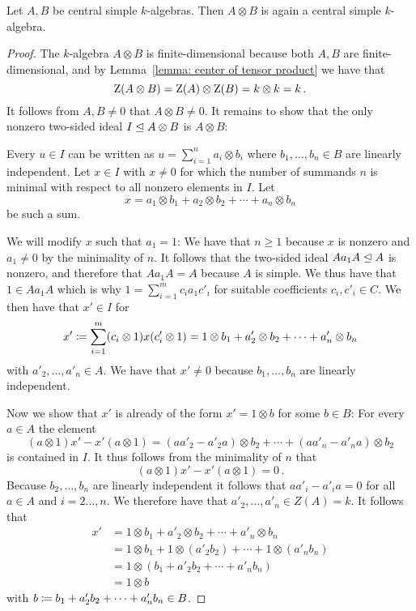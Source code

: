 \begin{corollary}
  Let $A, B$ be central simple $k$-algebras.
  Then $A \otimes B$ is again a central simple $k$-algebra.
\end{corollary}


\begin{proof}
  The $k$-algebra $A \otimes B$ is finite-dimensional because both $A, B$ are finite-di\-men\-si\-o\-nal, and by Lemma~\ref{lemma: center of tensor product} we have that
  \[
      \operatorname{Z}(A \otimes B)
    = \operatorname{Z}(A) \otimes \operatorname{Z}(B)
    = k \otimes k
    = k \,.
  \]
  It follows from $A, B \neq 0$ that $A \otimes B \neq 0$.
  It remains to show that the only nonzero two-sided ideal $I \trianglelefteq A \otimes B$ is $A \otimes B$:
  
  Every $u \in I$ can be written as $u = \sum_{i=1}^n a_i \otimes b_i$ where $b_1, \dotsc, b_n \in B$ are linearly independent.
  Let $x \in I$ with $x \neq 0$ for which the number of summands $n$ is minimal with respect to all nonzero elements in $I$.
  Let
  \begin{equation}
    \label{eqn: u as a sum}
      x
    = a_1 \otimes b_1 + a_2 \otimes b_2 + \dotsb + a_n \otimes b_n
  \end{equation}
  be such a sum.
  
  We will modify $x$ such that $a_1 = 1$:
  We have that $n \geq 1$ because $x$ is nonzero and $a_1 \neq 0$ by the minimality of $n$.
  It follows that the two-sided ideal $A a_1 A \trianglelefteq A$ is nonzero, and therefore that $A a_1 A = A$ because $A$ is simple.
  We thus have that $1 \in A a_1 A$ which is why $1 = \sum_{i=1}^m c_i a_1 c'_i$ for suitable coefficients $c_i, c'_i \in C$.
  We then have that $x' \in I$ for
  \[
              x'
    \coloneqq  \sum_{i=1}^m (c_i \otimes 1) x (c'_i \otimes 1)
    =         1 \otimes b_1 + a'_2 \otimes b_2 + \dotsb + a'_n \otimes b_n
  \]
  with $a'_2, \dotsc, a'_n \in A$.
  We have that $x' \neq 0$ because $b_1, \dotsc, b_n$ are linearly independent.
  
  Now we show that $x'$ is already of the form $x' = 1 \otimes b$ for some $b \in B$:
  For every $a \in A$ the element
  \[
        (a \otimes 1) x' - x' (a \otimes 1)
    =     (a a'_2 - a'_2 a) \otimes b_2
        + \dotsb
        + (a a'_n - a'_n a) \otimes b_2
  \]
  is contained in $I$.
  It thus follows from the minimality of $n$ that
  \[
      (a \otimes 1) x' - x' (a \otimes 1)
    = 0 \,.
  \]
  Because $b_2, \dotsc, b_n$ are linearly independent it follows that $a a'_i - a'_i a = 0$ for all $a \in A$ and $i = 2 \dotsc, n$.
  We therefore have that $a'_2, \dotsc, a'_n \in Z(A) = k$.
  It follows that
  \begin{align*}
        x'
    &=  1 \otimes b_1 + a'_2 \otimes b_2 + \dotsb + a'_n \otimes b_n  \\
    &=  1 \otimes b_1 + 1 \otimes (a'_2 b_2) + \dotsb + 1 \otimes (a'_n b_n)  \\
    &=  1 \otimes (b_1 + a'_2 b_2 + \dotsb + a'_n b_n)  \\
    &=  1 \otimes b
  \end{align*}
  with $b \coloneqq b_1 + a'_2 b_2 + \dotsb + a'_n b_n \in B$.
  

\end{proof}
